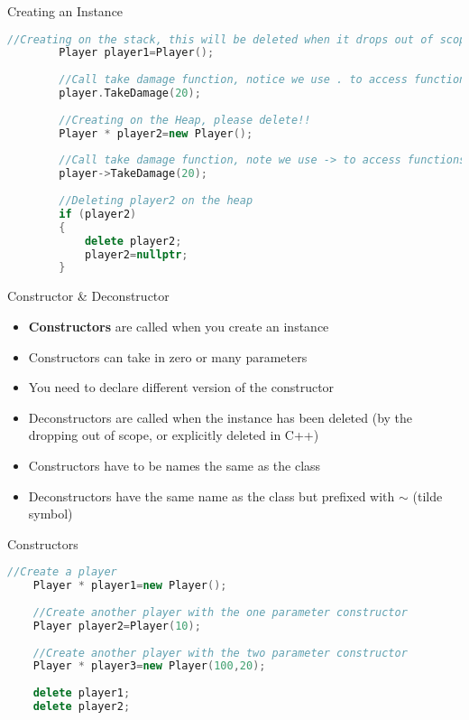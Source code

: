 \begin{frame}[fragile]{Creating an Instance}
	\begin{lstlisting}[language=C++,basicstyle=\tiny,]
		//Creating on the stack, this will be deleted when it drops out of scope
		Player player1=Player();
		
		//Call take damage function, notice we use . to access functions
		player.TakeDamage(20);
		
		//Creating on the Heap, please delete!!
		Player * player2=new Player();
		
		//Call take damage function, note we use -> to access functions
		player->TakeDamage(20);
		
		//Deleting player2 on the heap
		if (player2)
		{
			delete player2;
			player2=nullptr;
		}
	\end{lstlisting}
\end{frame}


\begin{frame}{Constructor \& Deconstructor}
	\begin{itemize}
		\pause \item \textbf{Constructors} are called when you create an instance
		\pause \item Constructors can take in zero or many parameters
		\pause \item You need to declare different version of the constructor
		\pause \item Deconstructors are called when the instance has been deleted (by the dropping out of scope, or explicitly deleted in C++)
		\pause \item Constructors have to be names the same as the class
		\pause \item Deconstructors have the same name as the class but prefixed with \textbf{$\sim$} (tilde symbol)
	\end{itemize}
\end{frame}

\begin{frame}[fragile]{Constructors}
	\begin{lstlisting}[language=C++,basicstyle=\tiny,]
	//Create a player
	Player * player1=new Player();
	
	//Create another player with the one parameter constructor
	Player player2=Player(10);
	
	//Create another player with the two parameter constructor
	Player * player3=new Player(100,20);
	
	delete player1;
	delete player2;
	\end{lstlisting}
\end{frame}


